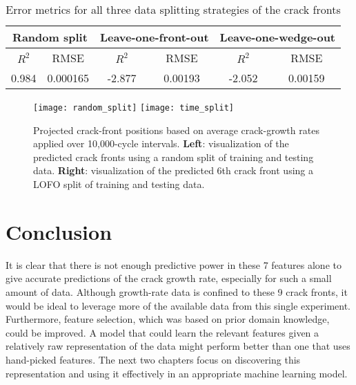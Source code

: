\begin{table}[b]
  \centering
  \caption{Error metrics for all three data splitting strategies of the crack fronts}
  \label{table:error-metrics}
  \begin{tabular}{| c | c | c | c | c | c |} \hline
  \multicolumn{2}{|c|}{Random split} & \multicolumn{2}{|c|}{Leave-one-front-out} & \multicolumn{2}{|c|}{Leave-one-wedge-out} \\ \hline
  $R^2$ & RMSE & $R^2$ & RMSE & $R^2$ & RMSE \\ \hline
  0.984 & 0.000165 & -2.877 & 0.00193 & -2.052 & 0.00159 \\ \hline
  \end{tabular}
\end{table}

\begin{figure}[b]
  \centering
  \texttt{[image: random\_split]}
  \texttt{[image: time\_split]}

  \caption{Projected crack-front positions based on average crack-growth rates applied over 10,000-cycle intervals.
           \textbf{Left}: visualization of the predicted crack fronts using a random split of training
and testing data.
           \textbf{Right}: visualization of the predicted 6th crack front using a LOFO split of training and testing data.}
  \label{fig:crack_front_prediction}
\end{figure}

\section{Conclusion}
It is clear that there is not enough predictive power in these 7 features alone to give accurate predictions of the crack growth rate, especially for such a small amount of data.  Although growth-rate data is confined to these 9 crack fronts, it would be ideal to leverage more of the available data from this single experiment.  Furthermore, feature selection, which was based on prior domain knowledge, could be improved.  A model that could learn the relevant features given a relatively raw representation of the data might perform better than one that uses hand-picked features.  The next two chapters focus on discovering this representation and using it effectively in an appropriate machine learning model.



